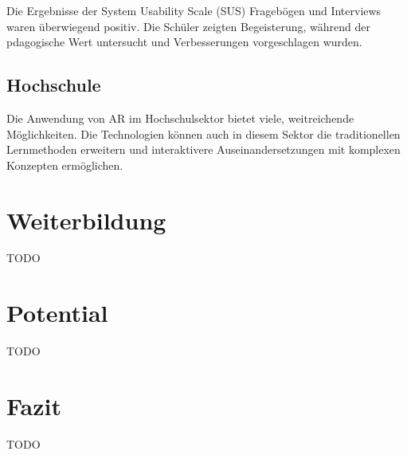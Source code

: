 \documentclass[conference]{IEEEtran}
\begin{document}
Die Ergebnisse der System Usability Scale (SUS) Fragebögen und Interviews waren überwiegend positiv. Die Schüler zeigten Begeisterung, während 
der pdagogische Wert untersucht und Verbesserungen vorgeschlagen wurden. \cite{b8}

\subsection{Hochschule}
Die Anwendung von AR im Hochschulsektor bietet viele, weitreichende Möglichkeiten. Die Technologien können auch in diesem Sektor die traditionellen
Lernmethoden erweitern und interaktivere Auseinandersetzungen mit komplexen Konzepten ermöglichen.

\section{Weiterbildung}
TODO

\section{Potential}
TODO

\section{Fazit}
TODO
\end{document}
